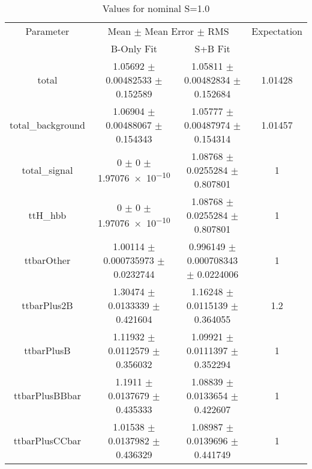 \begin{table}
\centering
\caption{Values for nominal S=1.0}
\begin{tabular}{cccc}
\toprule
Parameter & \multicolumn{2}{c}{Mean $\pm$ Mean Error $\pm$ RMS} & Expectation\\
 & B-Only Fit & S+B Fit & \\
\midrule
total & \num{1.05692} $\pm$ \num{0.00482533} $\pm$ \num{0.152589} & \num{1.05811} $\pm$ \num{0.00482834} $\pm$ \num{0.152684} & \num{1.01428}\\
total\_background & \num{1.06904} $\pm$ \num{0.00488067} $\pm$ \num{0.154343} & \num{1.05777} $\pm$ \num{0.00487974} $\pm$ \num{0.154314} & \num{1.01457}\\
total\_signal & \num{0} $\pm$ \num{0} $\pm$ \num{1.97076e-10} & \num{1.08768} $\pm$ \num{0.0255284} $\pm$ \num{0.807801} & \num{1}\\
ttH\_hbb & \num{0} $\pm$ \num{0} $\pm$ \num{1.97076e-10} & \num{1.08768} $\pm$ \num{0.0255284} $\pm$ \num{0.807801} & \num{1}\\
ttbarOther & \num{1.00114} $\pm$ \num{0.000735973} $\pm$ \num{0.0232744} & \num{0.996149} $\pm$ \num{0.000708343} $\pm$ \num{0.0224006} & \num{1}\\
ttbarPlus2B & \num{1.30474} $\pm$ \num{0.0133339} $\pm$ \num{0.421604} & \num{1.16248} $\pm$ \num{0.0115139} $\pm$ \num{0.364055} & \num{1.2}\\
ttbarPlusB & \num{1.11932} $\pm$ \num{0.0112579} $\pm$ \num{0.356032} & \num{1.09921} $\pm$ \num{0.0111397} $\pm$ \num{0.352294} & \num{1}\\
ttbarPlusBBbar & \num{1.1911} $\pm$ \num{0.0137679} $\pm$ \num{0.435333} & \num{1.08839} $\pm$ \num{0.0133654} $\pm$ \num{0.422607} & \num{1}\\
ttbarPlusCCbar & \num{1.01538} $\pm$ \num{0.0137982} $\pm$ \num{0.436329} & \num{1.08987} $\pm$ \num{0.0139696} $\pm$ \num{0.441749} & \num{1}\\
\bottomrule
\end{tabular}
\end{table}
